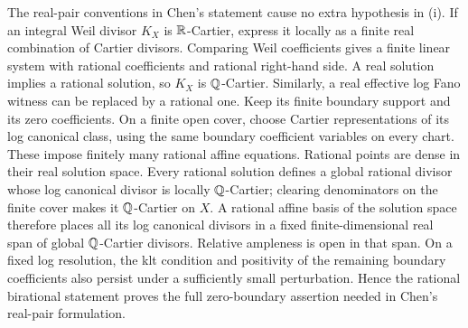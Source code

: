 The real-pair conventions in Chen's statement cause no extra hypothesis
in (i).  If an integral Weil divisor $K_X$ is $\mathbb R$-Cartier, express it
locally as a finite real combination of Cartier divisors.  Comparing Weil
coefficients gives a finite linear system with rational coefficients and
rational right-hand side.  A real solution implies a rational solution,
so $K_X$ is $\mathbb Q$-Cartier.  Similarly, a real effective log Fano witness
can be replaced by a rational one.  Keep its finite boundary support
and its zero coefficients.  On a finite open cover, choose Cartier
representations of its log canonical class, using the same boundary
coefficient variables on every chart.  These impose finitely many
rational affine equations.  Rational points are dense in their real
solution space.  Every rational solution defines a global rational
divisor whose log canonical divisor is locally $\mathbb Q$-Cartier; clearing
denominators on the finite cover makes it $\mathbb Q$-Cartier on $X$.  A rational
affine basis of the solution space therefore places all its log canonical
divisors in a fixed finite-dimensional real span of global $\mathbb Q$-Cartier
divisors.  Relative ampleness is open in that span.  On a fixed log
resolution, the klt condition and positivity of the remaining boundary
coefficients also persist under a sufficiently small perturbation.
Hence the rational birational
statement proves the full zero-boundary assertion needed in Chen's
real-pair formulation.

